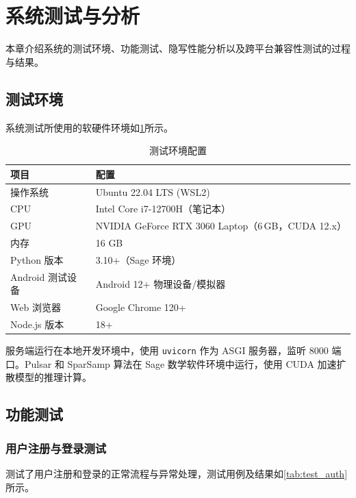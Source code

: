 \section{系统测试与分析}\label{chap:testing}

本章介绍系统的测试环境、功能测试、隐写性能分析以及跨平台兼容性测试的过程与结果。

\subsection{测试环境}

系统测试所使用的软硬件环境如\cref{tab:test_env}所示。

\begin{table}[htbp]
    \caption{测试环境配置}
    \centering
    \begin{tabular}{ll}
        \hline
        \textbf{项目} & \textbf{配置} \\
        \hline
        操作系统 & Ubuntu 22.04 LTS (WSL2) \\
        CPU & Intel Core i7-12700H（笔记本） \\
        GPU & NVIDIA GeForce RTX 3060 Laptop（6\,GB，CUDA 12.x） \\
        内存 & 16 GB \\
        Python 版本 & 3.10+（Sage 环境） \\
        Android 测试设备 & Android 12+ 物理设备/模拟器 \\
        Web 浏览器 & Google Chrome 120+ \\
        Node.js 版本 & 18+ \\
        \hline
    \end{tabular}
    \label{tab:test_env}
\end{table}

服务端运行在本地开发环境中，使用 \texttt{uvicorn} 作为 ASGI 服务器，监听 8000 端口。Pulsar 和 SparSamp 算法在 Sage 数学软件环境中运行，使用 CUDA 加速扩散模型的推理计算。

\subsection{功能测试}

\subsubsection{用户注册与登录测试}

测试了用户注册和登录的正常流程与异常处理，测试用例及结果如\cref{tab:test_auth}所示。

